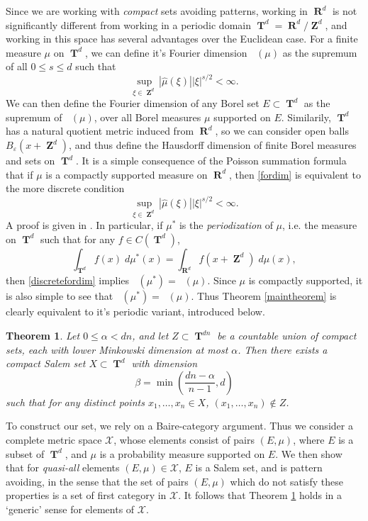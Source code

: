 \documentclass[12pt,reqno]{article}
\numberwithin{equation}{section}
\DeclareMathOperator{\hausdim}{\dim_{\mathbf{H}}}
\DeclareMathOperator{\fordim}{\dim_{\mathbf{F}}}
\DeclareMathOperator{\RR}{\mathbf{R}}
\DeclareMathOperator{\ZZ}{\mathbf{Z}}
\DeclareMathOperator{\TT}{\mathbf{T}}
\newtheorem{theorem}{Theorem}
\begin{document}
Since we are working with \emph{compact} sets avoiding patterns, working in $\RR^d$ is not significantly different from working in a periodic domain $\TT^d = \RR^d / \ZZ^d$, and working in this space has several advantages over the Euclidean case. For a finite measure $\mu$ on $\TT^d$, we can define it's Fourier dimension $\fordim(\mu)$ as the supremum of all $0 \leq s \leq d$ such that
%
\begin{equation} \label{fordimtorus}
    \sup_{\xi \in \ZZ^d} |\widehat{\mu}(\xi)| |\xi|^{s/2} < \infty.
\end{equation}
%
We can then define the Fourier dimension of any Borel set $E \subset \TT^d$ as the supremum of $\fordim(\mu)$, over all Borel measures $\mu$ supported on $E$. Similarily, $\TT^d$ has a natural quotient metric induced from $\RR^d$, so we can consider open balls $B_\varepsilon(x + \ZZ^d)$, and thus define the Hausdorff dimension of finite Borel measures and sets on $\TT^d$. It is a simple consequence of the Poisson summation formula that if $\mu$ is a compactly supported measure on $\RR^d$, then \eqref{fordim} is equivalent to the more discrete condition
%
\begin{equation} \label{discretefordim}
    \sup_{\xi \in \ZZ^d} |\widehat{\mu}(\xi)| |\xi|^{s/2} < \infty.
\end{equation}
%
A proof is given in \cite[Lemma 39]{myThesis}. In particular, if $\mu^*$ is the \emph{periodization} of $\mu$, i.e. the measure on $\TT^d$ such that for any $f \in C(\TT^d)$,
%
\[ \int_{\TT^d} f(x)\; d\mu^*(x) = \int_{\RR^d} f(x + \ZZ^d)\; d\mu(x), \]
%
then \eqref{discretefordim} implies $\fordim(\mu^*) = \fordim(\mu)$. Since $\mu$ is compactly supported, it is also simple to see that $\hausdim(\mu^*) = \hausdim(\mu)$. Thus Theorem \ref{maintheorem} is clearly equivalent to it's periodic variant, introduced below.

\begin{theorem} \label{periodictheorem}
    Let $0 \leq \alpha < dn$, and let $Z \subset \TT^{dn}$ be a countable union of compact sets, each with lower Minkowski dimension at most $\alpha$. Then there exists a compact Salem set $X \subset \TT^d$ with dimension
    \[ \beta = \min \left( \frac{dn - \alpha}{n-1}, d \right) \]
    such that for any distinct points $x_1, \dots, x_n \in X$, $(x_1, \dots, x_n) \not \in Z$.
\end{theorem}

To construct our set, we rely on a Baire-category argument. Thus we consider a complete metric space $\mathcal{X}$, whose elements consist of pairs $(E,\mu)$, where $E$ is a subset of $\TT^d$, and $\mu$ is a probability measure supported on $E$. We then show that for \emph{quasi-all} elements $(E,\mu) \in \mathcal{X}$, $E$ is a Salem set, and is pattern avoiding, in the sense that the set of pairs $(E,\mu)$ which do not satisfy these properties is a set of first category in $\mathcal{X}$. It follows that Theorem \ref{periodictheorem} holds in a `generic' sense for elements of $\mathcal{X}$.
\end{document}

